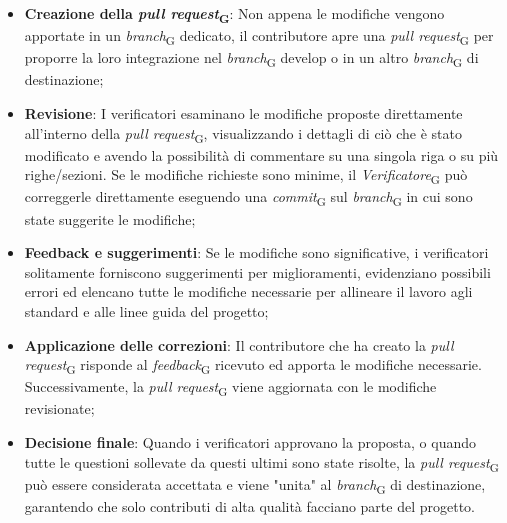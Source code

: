 \begin{itemize}
    \item \textbf{Creazione della \textit{pull request}\textsubscript{G}}: Non appena le modifiche vengono apportate in un \textit{branch}\textsubscript{G} dedicato, il contributore apre una \textit{pull request}\textsubscript{G} per proporre la loro integrazione nel \textit{branch}\textsubscript{G} develop o in un altro \textit{branch}\textsubscript{G} di destinazione;
    \item \textbf{Revisione}: I verificatori esaminano le modifiche proposte direttamente all'interno della \textit{pull request}\textsubscript{G}, visualizzando i dettagli di ciò che è stato modificato e avendo la possibilità di commentare su una singola riga o su più righe/sezioni. Se le modifiche richieste sono minime, il \textit{Verificatore}\textsubscript{G} può correggerle direttamente eseguendo una \textit{commit}\textsubscript{G} sul \textit{branch}\textsubscript{G} in cui sono state suggerite le modifiche;
    \item \textbf{Feedback e suggerimenti}: Se le modifiche sono significative, i verificatori solitamente forniscono suggerimenti per miglioramenti, evidenziano possibili errori ed elencano tutte le modifiche necessarie per allineare il lavoro agli standard e alle linee guida del progetto;
    \item \textbf{Applicazione delle correzioni}: Il contributore che ha creato la \textit{pull request}\textsubscript{G} risponde al \textit{feedback}\textsubscript{G} ricevuto ed apporta le modifiche necessarie. Successivamente, la \textit{pull request}\textsubscript{G} viene aggiornata con le modifiche revisionate;
    \item \textbf{Decisione finale}: Quando i verificatori approvano la proposta, o quando tutte le questioni sollevate da questi ultimi sono state risolte, la \textit{pull request}\textsubscript{G} può essere considerata accettata e viene "unita" al \textit{branch}\textsubscript{G} di destinazione, garantendo che solo contributi di alta qualità facciano parte del progetto.
\end{itemize}
